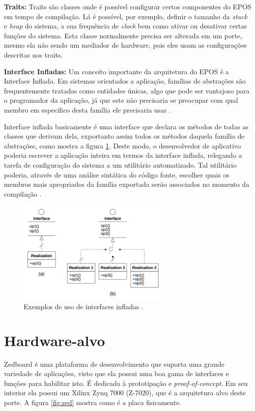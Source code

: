 \textbf{Traits:} Traits são classes onde é possível configurar certos componentes do EPOS em tempo de compilação. Lá é possível, por exemplo, definir o tamanho da \emph{stack} e \emph{heap} do sistema, a sua frequência de \emph{clock} bem como ativar ou desativar certas funções do sistema. Esta classe normalmente precisa ser alterada em um porte, mesmo ela não sendo um mediador de hardware, pois eles usam as configurações descritas nos traits.

\textbf{Interface Infladas: } Um conceito importante da arquitetura do EPOS é a Interface Inflada. %
Em sistemas orientados a aplicação, famílias de abstrações são frequentemente tratadas como entidades únicas, algo que pode ser vantajoso para o programador da aplicação, já que este não precisaria se preocupar com qual membro em específico desta família ele precisaria usar \cite{guto_thesis}.

Interface inflada basicamente é uma interface que declara os métodos de todas as classes que derivam dela, exportanto assim todos os métodos daquela família de abstrações, como mostra a figura \ref{fig:inflated}. Deste modo, o desenvolvedor de aplicativo poderia escrever a aplicação inteira em termos da interface inflada, relegando a tarefa de configuração do sistema a um utilitário automatizado. Tal utilitário poderia, através de uma análise sintática do código fonte, escolher quais os membros mais apropriados da família exportada serão associados no momento da compilação \cite[p.~56]{guto_thesis}.

\begin{figure}[ht!]
	\label{fig:inflated}
    \centering
    \includegraphics[width=7.5cm]{figuras/inflated_interface}
    \caption{Exemplos de uso de interfaces infladas \cite{guto_thesis}.}
\end{figure}


\section{Hardware-alvo}
Zedboard é uma plataforma de desenvolvimento que suporta uma grande variedade de aplicações, visto que ela possui uma boa gama de interfaces e funções para habilitar isto. É dedicada à prototipação e \emph{proof-of-concept}. Em seu interior ela possui um Xilinx Zynq 7000 (Z-7020), que é a arquitetura alvo deste porte. A figura \ref{fig:zed} mostra como é a placa fisicamente.


